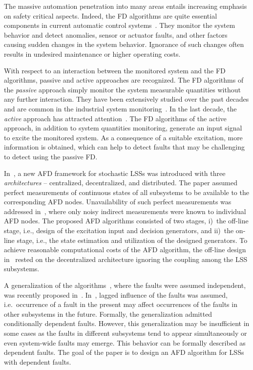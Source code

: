 \documentclass[conference,10pt]{IEEEtran}
\begin{document}
The massive automation penetration into many areas entails increasing emphasis on safety critical aspects. 
Indeed, the FD algorithms are quite essential components in current automatic control systems~\cite{Severson2015:cp:SAFEPROCESS}. 
They monitor the system behavior and detect anomalies, sensor or actuator faults, and other factors causing sudden changes in the system behavior. 
Ignorance of such changes often results in undesired maintenance or higher operating costs.

With respect to an interaction between the monitored system and the FD algorithms, passive and active approaches are recognized. 
The FD algorithms of the \textit{passive} approach simply monitor the system measurable quantities without any further interaction. 
They have been extensively studied over the past decades and are common in the industrial system monitoring~\cite{Simani2003:b,Blanke2016:b}. 
In the last decade, the \textit{active} approach has attracted attention~\cite{Niemann2005:cp:ACC,Raimondo2016:cp:CDC}. 
The FD algorithms of the active approach, in addition to system quantities monitoring, generate an input signal to excite the monitored system. 
As a consequence of a suitable excitation, more information  is obtained, which can help to detect faults that may be challenging to detect using the passive FD\@.

In~\cite{Puncochar2019:cp:ACC}, a new AFD framework for stochastic LSSs was introduced with three \emph{architectures} -- centralized, decentralized, and distributed. 
The paper assumed perfect measurements of continuous states of all subsystems to be available to the corresponding AFD nodes. 
Unavailability of such perfect measurements was addressed in~\cite{Straka2019:cp:FUSION}, where only noisy indirect measurements were known to individual AFD nodes. 
The proposed AFD algorithms consisted of two stages, i)~the off-line stage, i.e., design of the excitation input and decision generators, and ii)~the on-line stage, i.e., the state estimation and utilization of the designed generators.
To achieve reasonable computational costs of the AFD algorithm, the off-line design in~\cite{Puncochar2019:cp:ACC,Straka2019:cp:FUSION} rested on the decentralized architecture ignoring the coupling among the LSS subsystems. 

A generalization of the algorithms~\cite{Puncochar2019:cp:ACC,Straka2019:cp:FUSION}, where the faults were assumed independent, was recently proposed in~\cite{StraPu:20}.
In~\cite{StraPu:20}, lagged influence of the faults was assumed, i.e.\ occurrence of a fault in the present may affect occurrences of the faults in other subsystems in the future. 
Formally, the generalization admitted conditionally dependent faults.
However, this generalization may be insufficient in some cases as the faults in different subsystems tend to appear simultaneously or even system-wide faults may emerge. 
This behavior can be formally described as dependent faults.
The goal of the paper is to design an AFD algorithm for LSSs with dependent faults.
\end{document}
